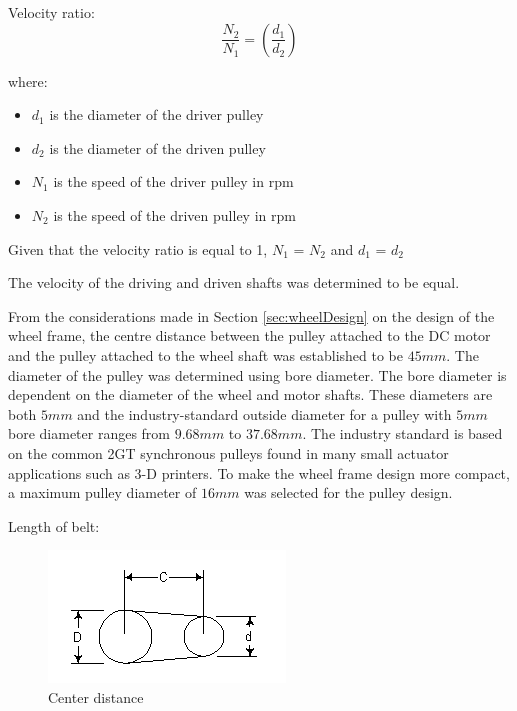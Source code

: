 Velocity ratio:
\begin{equation}
\label{eq:3}
    \frac{N_2}{N_1} = \left(\frac{d_1}{d_2}\right)
\end{equation}

where: 
\begin{itemize}
\item \(d_1\)  is the diameter of the driver pulley
\item \(d_2\)  is the diameter of the driven pulley
\item \(N_1\)  is the speed of the driver pulley in rpm
\item \(N_2\)  is the speed of the driven pulley in rpm
\end{itemize}

Given that the velocity ratio is equal to 1, \(N_1\) = \(N_2\) and \(d_1\) = \(d_2\)

The velocity of the driving and driven shafts was determined to be equal.

From the considerations made in Section \ref{sec:wheelDesign} on the design of the wheel frame, the centre distance between the pulley attached to the \ac{DC} motor and the pulley attached to the wheel shaft was established to be $45mm$.
The diameter of the pulley was determined using bore diameter. The bore diameter is dependent on the diameter of the wheel and motor shafts. These diameters are both $5mm$ and the industry-standard outside diameter for a pulley with $5mm$ bore diameter ranges from $9.68mm$ to $37.68mm$. The industry standard is based on the common 2GT synchronous pulleys found in many small actuator applications such as 3-D printers. To make the wheel frame design more compact, a maximum pulley diameter of $16mm$ was selected for the pulley design.

\vspace{2mm}

Length of belt:

\begin{figure}[H]
    \centering
    \includegraphics{Figures/NewPulley.png}
    \caption[Center distance]{Center distance\cite{noauthor_pulley_nodate}}
    \label{fig:centerdistance}
\end{figure}

